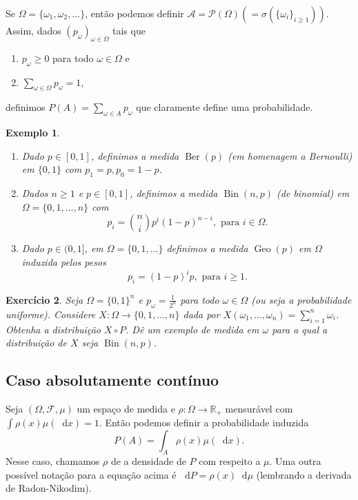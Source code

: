 \documentclass[reqno]{article}
\newcommand*\1{\mathds{1}}
\DeclareMathOperator{\Ber}{Ber}
\DeclareMathOperator{\Geo}{Geo}
\DeclareMathOperator{\Bin}{Bin}
\newtheorem{example}{Exemplo}[section]
\newtheorem{exercise}[example]{Exercício}
\renewcommand*\d{\mathop{}\!\mathrm{d}}
\begin{document}
Se $\Omega = \{\omega_1, \omega_2, \dots\}$, então podemos definir $\mathcal{A} = \mathcal{P}(\Omega) (= \sigma(\{\omega_i\}_{i \geq 1}))$.
Assim, dados $(p_\omega)_{\omega \in \Omega}$ tais que
\begin{enumerate}
\item $p_\omega \geq 0$ para todo $\omega \in \Omega$ e
\item $\sum_{\omega \in \Omega} p_\omega = 1$,
\end{enumerate}
definimos $P(A) = \sum_{\omega \in A} p_\omega$ que claramente define uma probabilidade.

\begin{example} \mbox{}
  \begin{enumerate}
  \item Dado $p \in [0,1]$, definimos a medida $\Ber(p)$ (em homenagem a Bernoulli) em $\{0,1\}$ com $p_1 = p, p_0 = 1-p$.
  \item Dados $n \geq 1$ e $p \in [0,1]$, definimos a medida $\Bin(n,p)$ (de binomial) em $\Omega = \{0, 1, \dots, n\}$ com
    \begin{equation}
      p_i = \binom ni p^i (1-p)^{n-i}, \text{ para $i \in \Omega$.}
    \end{equation}
  \item Dado $p \in (0,1]$, em $\Omega = \{0, 1, \dots\}$ definimos a medida $\Geo(p)$ em $\Omega$ induzida pelos pesos
  \begin{equation}
    p_i = (1-p)^i p, \text{ para $i \geq 1$.}
  \end{equation}
  \end{enumerate}
\end{example}

\begin{exercise}
  Seja $\Omega = \{0,1\}^n$ e $p_\omega = \tfrac 1{2^n}$ para todo $\omega \in \Omega$ (ou seja a probabilidade uniforme).
  Considere $X: \Omega \to \{0,1, \dots, n\}$ dada por $X(\omega_1, \dots, \omega_n) = \sum_{i=1}^n \omega_i$.
  Obtenha a distribuição $X \circ P$.
  Dê um exemplo de medida em $\omega$ para a qual a distribuição de $X$ seja $\Bin(n,p)$.
\end{exercise}


\subsection{Caso absolutamente contínuo}

Seja $(\Omega, \mathcal{F}, \mu)$ um espaço de medida e $\rho:\Omega \to \mathbb{R}_+$ mensurável com $\int \rho(x) \mu(\d x) = 1$.
Então podemos definir a probabilidade induzida
\begin{equation}
  \label{e:absolutamente_cont}
  P(A) = \int_A \rho(x) \mu(\d x).
\end{equation}
Nesse caso, chamamos $\rho$ de a densidade de $P$ com respeito a $\mu$.
Uma outra possível notação para a equação acima é $\d P = \rho(x) \d \mu$ (lembrando a derivada de Radon-Nikodim).
\end{document}
